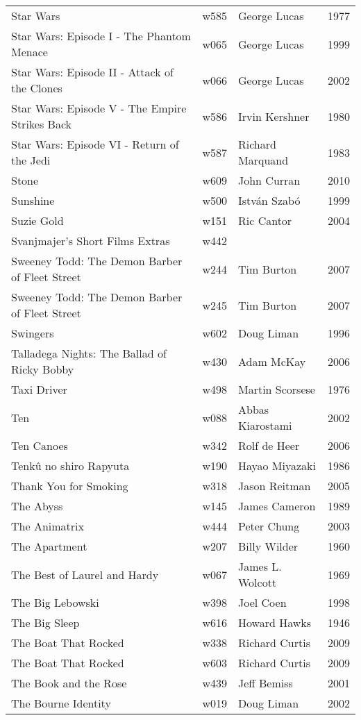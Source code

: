 \documentclass{article}
\begin{document}
\begin {center}
\begin{longtable}{p{10cm} l l l}
Star Wars & w585 & George Lucas & 1977 \\
Star Wars: Episode I - The Phantom Menace & w065 & George Lucas & 1999 \\
Star Wars: Episode II - Attack of the Clones & w066 & George Lucas & 2002 \\
Star Wars: Episode V - The Empire Strikes Back & w586 & Irvin Kershner & 1980 \\
Star Wars: Episode VI - Return of the Jedi & w587 & Richard Marquand & 1983 \\
Stone & w609 & John Curran & 2010 \\
Sunshine & w500 & István Szabó & 1999 \\
Suzie Gold & w151 & Ric Cantor & 2004 \\
Svanjmajer's Short Films Extras & w442 &  &  \\
Sweeney Todd: The Demon Barber of Fleet Street & w244 & Tim Burton & 2007 \\
Sweeney Todd: The Demon Barber of Fleet Street & w245 & Tim Burton & 2007 \\
Swingers & w602 & Doug Liman & 1996 \\
Talladega Nights: The Ballad of Ricky Bobby & w430 & Adam McKay & 2006 \\
Taxi Driver & w498 & Martin Scorsese & 1976 \\
Ten & w088 & Abbas Kiarostami & 2002 \\
Ten Canoes & w342 & Rolf de Heer & 2006 \\
Tenkû no shiro Rapyuta & w190 & Hayao Miyazaki & 1986 \\
Thank You for Smoking & w318 & Jason Reitman & 2005 \\
The Abyss & w145 & James Cameron & 1989 \\
The Animatrix & w444 & Peter Chung & 2003 \\
The Apartment & w207 & Billy Wilder & 1960 \\
The Best of Laurel and Hardy & w067 & James L. Wolcott & 1969 \\
The Big Lebowski & w398 & Joel Coen & 1998 \\
The Big Sleep & w616 & Howard Hawks & 1946 \\
The Boat That Rocked & w338 & Richard Curtis & 2009 \\
The Boat That Rocked & w603 & Richard Curtis & 2009 \\
The Book and the Rose & w439 & Jeff Bemiss & 2001 \\
The Bourne Identity & w019 & Doug Liman & 2002 \\

\end{longtable}
\end{center}
\end{document}
